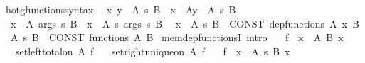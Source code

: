 \begin{isabellebody}
\isamarkupfalse%
\isanewline
{}\isamarkupfalse%
\ hotg{\isacharunderscore}{\kern0pt}functions{\isacharunderscore}{\kern0pt}syntax\isanewline
\isanewline
{}\isamarkupfalse%
\isanewline
\ \ {\isachardoublequoteopen}{\isacharparenleft}{\kern0pt}x\ y\ {\isasymin}\ A{\isacharparenright}{\kern0pt}\ {\isasymrightarrow}s\ B{\isachardoublequoteclose}\ {\isasymrightharpoonup}\ {\isachardoublequoteopen}{\isacharparenleft}{\kern0pt}x\ {\isasymin}\ A{\isacharparenright}{\kern0pt}{\isacharparenleft}{\kern0pt}y\ {\isasymin}\ A{\isacharparenright}{\kern0pt}\ {\isasymrightarrow}s\ B{\isachardoublequoteclose}\isanewline
\ \ {\isachardoublequoteopen}{\isacharparenleft}{\kern0pt}x\ {\isasymin}\ A{\isacharparenright}{\kern0pt}\ args\ {\isasymrightarrow}s\ B{\isachardoublequoteclose}\ {\isasymrightharpoonup}\ {\isachardoublequoteopen}{\isacharparenleft}{\kern0pt}x\ {\isasymin}\ A{\isacharparenright}{\kern0pt}\ {\isasymrightarrow}s\ args\ {\isasymrightarrow}s\ B{\isachardoublequoteclose}\isanewline
\ \ {\isachardoublequoteopen}{\isacharparenleft}{\kern0pt}x\ {\isasymin}\ A{\isacharparenright}{\kern0pt}\ {\isasymrightarrow}s\ B{\isachardoublequoteclose}\ {\isasymrightleftharpoons}\ {\isachardoublequoteopen}CONST\ dep{\isacharunderscore}{\kern0pt}functions\ A\ {\isacharparenleft}{\kern0pt}{\isasymlambda}x{\isachardot}{\kern0pt}\ B{\isacharparenright}{\kern0pt}{\isachardoublequoteclose}\isanewline
\ \ {\isachardoublequoteopen}A\ {\isasymrightarrow}s\ B{\isachardoublequoteclose}\ {\isasymrightleftharpoons}\ {\isachardoublequoteopen}CONST\ functions\ A\ B{\isachardoublequoteclose}\isanewline
\isanewline
{}\isamarkupfalse%
\ mem{\isacharunderscore}{\kern0pt}dep{\isacharunderscore}{\kern0pt}functionsI\ {\isacharbrackleft}{\kern0pt}intro{\isacharbrackright}{\kern0pt}{\isacharcolon}{\kern0pt}\isanewline
\ \ \ {\isachardoublequoteopen}f\ {\isasymsubseteq}\ {\isacharparenleft}{\kern0pt}{\isasymSum}x\ {\isasymin}\ A{\isachardot}{\kern0pt}\ {\isacharparenleft}{\kern0pt}B\ x{\isacharparenright}{\kern0pt}{\isacharparenright}{\kern0pt}{\isachardoublequoteclose}\isanewline
\ \ \ {\isachardoublequoteopen}set{\isacharunderscore}{\kern0pt}left{\isacharunderscore}{\kern0pt}total{\isacharunderscore}{\kern0pt}on\ A\ f{\isachardoublequoteclose}\isanewline
\ \ \ {\isachardoublequoteopen}set{\isacharunderscore}{\kern0pt}right{\isacharunderscore}{\kern0pt}unique{\isacharunderscore}{\kern0pt}on\ A\ f{\isachardoublequoteclose}\isanewline
\ \ \ {\isachardoublequoteopen}f\ {\isasymin}\ {\isacharparenleft}{\kern0pt}x\ {\isasymin}\ A{\isacharparenright}{\kern0pt}\ {\isasymrightarrow}s\ {\isacharparenleft}{\kern0pt}B\ x{\isacharparenright}{\kern0pt}{\isachardoublequoteclose}\isanewline

\end{isabellebody}
